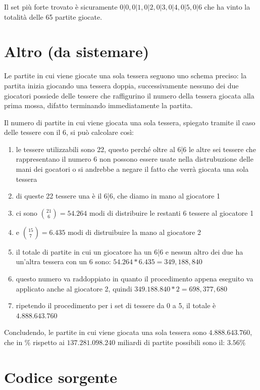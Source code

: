 \documentclass[a4paper,12pt]{report} %
\begin{document}
Il set più forte trovato è sicuramente \(0|0, 0|1, 0|2, 0|3, 0|4, 0|5, 0|6\) che ha vinto la totalità delle 65 partite giocate.

\chapter{Altro (da sistemare)}

Le partite in cui viene giocate una sola tessera seguono uno schema preciso: la partita inizia giocando una tessera doppia, successivamente nessuno dei due giocatori possiede delle tessere che raffigurino il numero della tessera giocata alla prima mossa, difatto terminando immediatamente la partita.

Il numero di partite in cui viene giocata una sola tessera, spiegato tramite il caso delle tessere con il 6, si può calcolare così:

\begin{enumerate}
    \item le tessere utilizzabili sono 22, questo perché oltre al 6|6 le altre sei tessere che rappresentano il numero 6 non possono essere usate nella distrubuzione delle mani dei gocatori o si andrebbe a negare il fatto che verrà giocata una sola tessera 
    \item di queste 22 tessere una è il 6|6, che diamo in mano al giocatore 1
    \item ci sono \(\binom{21}{6} = 54.264\) modi di distribuire le restanti 6 tessere al giocatore 1
    \item e \(\binom{15}{7} = 6.435\) modi di distruibuire la mano al giocatore 2
    \item il totale di partite in cui un giocatore ha un 6|6 e nessun altro dei due ha un'altra tessera con un 6 sono: \(54.264*6.435 = 349,188,840\)
    \item questo numero va raddoppiato in quanto il procedimento appena eseguito va applicato anche al giocatore 2, quindi \(349.188.840 * 2 = 698,377,680\)
    \item ripetendo il procedimento per i set di tessere da 0 a 5, il totale è \(4.888.643.760\)
\end{enumerate}

Concludendo, le partite in cui viene giocata una sola tessera sono \(4.888.643.760\), che in \% rispetto ai \(137.281.098.240\) miliardi di partite possibili sono il: \(3.56\%\)





\appendix
\chapter{Codice sorgente}

\end{document}
